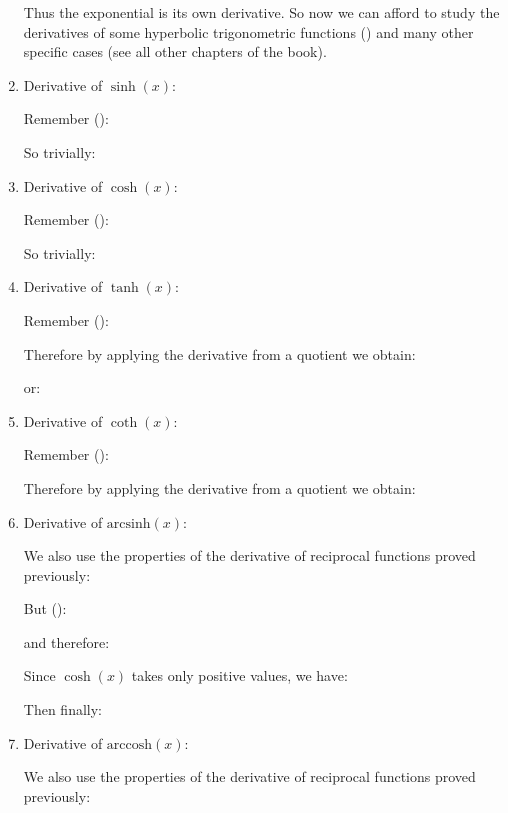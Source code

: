 \begin{enumerate}
		 	Thus the exponential is its own derivative. So now we can afford to study the derivatives of some hyperbolic trigonometric functions () and many other specific cases (see all other chapters of the book).
		 	\item Derivative of $\sinh(x)$:
		 	
		 	Remember ():
		 	
		 	So trivially:
		 	
		 	
		 	\item Derivative of $\cosh(x)$:
		 	
		 	Remember ():
		 	
		 	So trivially:
		 	
		 	
		 	\item Derivative of $\tanh(x)$:
		 	
		 	Remember ():
		 	
		 	Therefore by applying the derivative from a quotient we obtain:
		 	
		 	or:
		 	
		 	\item Derivative of $\coth(x)$:
		 	
		 	Remember ():
		 	
		 	Therefore by applying the derivative from a quotient we obtain:
		 	
		 	
		 	\item Derivative of $\text{arcsinh}(x)$:
		 	
		 	We also use the properties of the derivative of reciprocal functions proved previously:
		 	
		 	But ():
		 	
		 	and therefore:
		 	
		 	Since $\cosh(x)$ takes only positive values, we have:
		 	
		 	Then finally:
		 	
		 	
		 	\item Derivative of $\text{arccosh}(x)$:
		 	
		 	We also use the properties of the derivative of reciprocal functions proved previously:
		 	

\end{enumerate}
